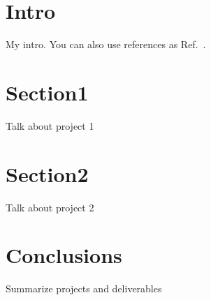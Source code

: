 
\section{Intro}
My intro. You can also use references as Ref.~\cite{P5}.

\section{Section1}
Talk about project 1

\section{Section2}
Talk about project 2

\section{Conclusions}
Summarize projects and deliverables